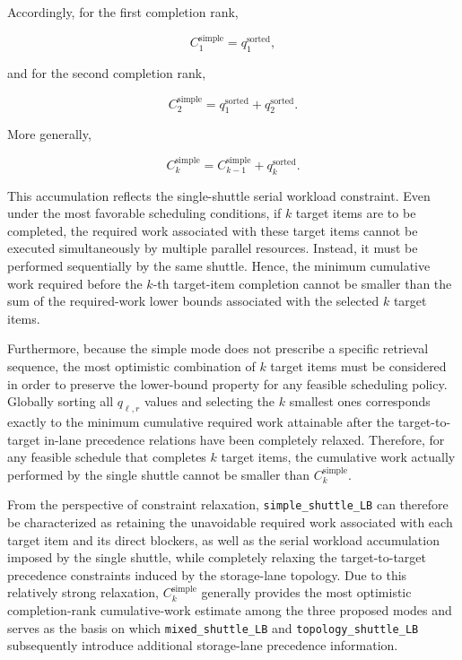 Accordingly, for the first completion rank,

\[
C_1^{\mathrm{simple}}
=
q^{\mathrm{sorted}}_1,
\]

and for the second completion rank,

\[
C_2^{\mathrm{simple}}
=
q^{\mathrm{sorted}}_1
+
q^{\mathrm{sorted}}_2.
\]

More generally,

\[
C_k^{\mathrm{simple}}
=
C_{k-1}^{\mathrm{simple}}
+
q^{\mathrm{sorted}}_k.
\]

This accumulation reflects the single-shuttle serial workload constraint.
Even under the most favorable scheduling conditions, if \(k\) target items are
to be completed, the required work associated with these target items cannot
be executed simultaneously by multiple parallel resources. Instead, it must
be performed sequentially by the same shuttle. Hence, the minimum cumulative
work required before the \(k\)-th target-item completion cannot be smaller than
the sum of the required-work lower bounds associated with the selected \(k\)
target items.

Furthermore, because the simple mode does not prescribe a specific retrieval
sequence, the most optimistic combination of \(k\) target items must be
considered in order to preserve the lower-bound property for any feasible
scheduling policy. Globally sorting all \(q_{\ell,r}\) values and selecting the
\(k\) smallest ones corresponds exactly to the minimum cumulative required
work attainable after the target-to-target in-lane precedence relations have
been completely relaxed. Therefore, for any feasible schedule that completes
\(k\) target items, the cumulative work actually performed by the single
shuttle cannot be smaller than \(C_k^{\mathrm{simple}}\).

From the perspective of constraint relaxation,
\texttt{simple\_shuttle\_LB} can therefore be characterized as retaining the
unavoidable required work associated with each target item and its direct
blockers, as well as the serial workload accumulation imposed by the single
shuttle, while completely relaxing the target-to-target precedence constraints
induced by the storage-lane topology. Due to this relatively strong
relaxation, \(C_k^{\mathrm{simple}}\) generally provides the most optimistic
completion-rank cumulative-work estimate among the three proposed modes and
serves as the basis on which \texttt{mixed\_shuttle\_LB} and
\texttt{topology\_shuttle\_LB} subsequently introduce additional
storage-lane precedence information.

